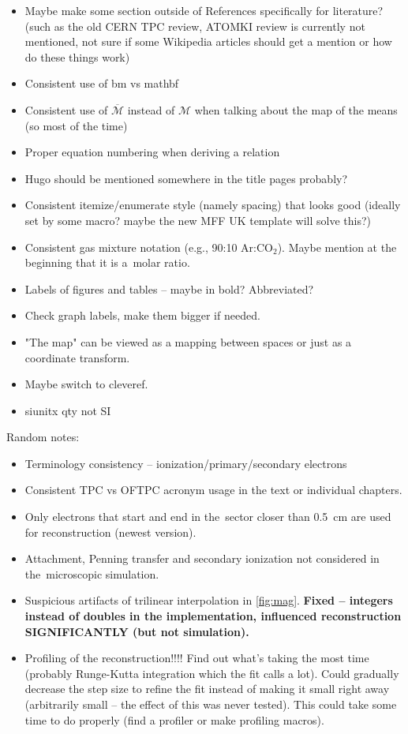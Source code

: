 {\begin{itemize}[topsep=4pt,itemsep=2pt]
				\item Maybe make some section outside of References specifically for literature? (such as the old CERN TPC review, ATOMKI review is currently not mentioned, not sure if some Wikipedia articles should get a mention or how do these things work)
				\item Consistent use of bm vs mathbf
				\item Consistent use of $\overbar{\mathcal{M}}$ instead of $\mathcal{M}$ when talking about the map of the means (so most of the time)
				\item Proper equation numbering when deriving a relation
				\item Hugo should be mentioned somewhere in the title pages probably?
				\item Consistent itemize/enumerate style (namely spacing) that looks good (ideally set by some macro? maybe the new MFF UK template will solve this?)
				\item Consistent gas mixture notation (e.g., 90:10 Ar:CO$_2$). Maybe mention at the beginning that it is a~molar ratio.
				\item Labels of figures and tables -- maybe in bold? Abbreviated?
				\item Check graph labels, make them bigger if needed.
				\item "The map" can be viewed as a mapping between spaces or just as a coordinate transform.
				\item Maybe switch to cleveref.
				\item siunitx qty not SI
			\end{itemize}
		Random notes:
			\begin{itemize}[topsep=4pt,itemsep=2pt]
				\item Terminology consistency -- ionization/primary/secondary electrons
				\item Consistent \ac{TPC} vs \ac{OFTPC} acronym usage in the text or individual chapters.
				\item Only electrons that start and end in the~sector closer than 0.5~cm are used for reconstruction (newest version).
				\item Attachment, Penning transfer and secondary ionization not considered in the~microscopic simulation.
				\item Suspicious artifacts of trilinear interpolation in \cref{fig:mag}. \textbf{Fixed -- integers instead of doubles in the implementation, influenced reconstruction SIGNIFICANTLY (but not simulation).}
				\item Profiling of the reconstruction!!!! Find out what's taking the most time (probably Runge-Kutta integration which the fit calls a lot). Could gradually decrease the step size to refine the fit instead of making it small right away (arbitrarily small -- the effect of this was never tested). This could take some time to do properly (find a profiler or make profiling macros).

\end{itemize}}
